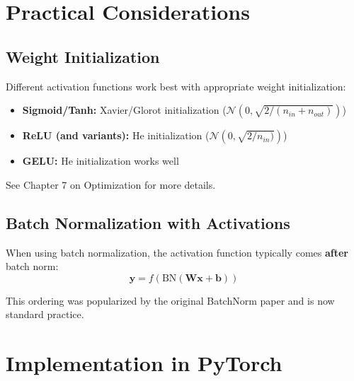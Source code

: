 \section{Practical Considerations}

\subsection{Weight Initialization}

Different activation functions work best with appropriate weight initialization:

\begin{itemize}
    \item \textbf{Sigmoid/Tanh:} Xavier/Glorot initialization ($\mathcal{N}(0, \sqrt{2/(n_{in} + n_{out})})$)
    \item \textbf{ReLU (and variants):} He initialization ($\mathcal{N}(0, \sqrt{2/n_{in})})$)
    \item \textbf{GELU:} He initialization works well
\end{itemize}

See Chapter 7 on Optimization for more details.

\subsection{Batch Normalization with Activations}

When using batch normalization, the activation function typically comes \textbf{after} batch norm:
\begin{equation}
\mathbf{y} = f(\text{BN}(\mathbf{W}\mathbf{x} + \mathbf{b}))
\end{equation}

This ordering was popularized by the original BatchNorm paper and is now standard practice.

\section{Implementation in PyTorch}

